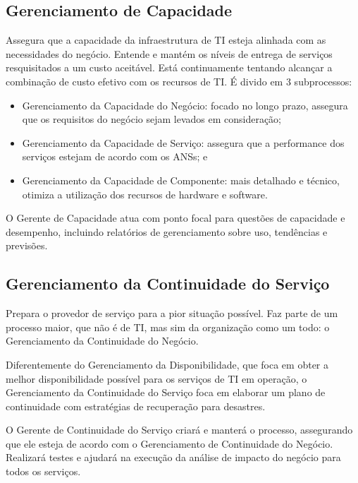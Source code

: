 \subsection{Gerenciamento de Capacidade}
Assegura que a capacidade da infraestrutura de TI esteja alinhada com as
necessidades do negócio. Entende e mantém os níveis de entrega de serviços
resquisitados a um custo aceitável. Está continuamente tentando alcançar a
combinação de custo efetivo com os recursos de TI. É divido em 3 subprocessos:
\begin{itemize}
    \item Gerenciamento da Capacidade do Negócio: focado no longo prazo,
        assegura que os requisitos do negócio sejam levados em consideração;
    \item Gerenciamento da Capacidade de Serviço: assegura que a performance
        dos serviços estejam de acordo com os ANSs; e
    \item Gerenciamento da Capacidade de Componente: mais detalhado e técnico,
        otimiza a utilização dos recursos de hardware e software.
\end{itemize}

O Gerente de Capacidade atua com ponto focal para questões de capacidade e
desempenho, incluindo relatórios de gerenciamento sobre uso, tendências e
previsões.


\subsection{Gerenciamento da Continuidade do Serviço}
Prepara o provedor de serviço para a pior situação possível. Faz parte de um
processo maior, que não é de TI, mas sim da organização como um todo: o
Gerenciamento da Continuidade do Negócio.

Diferentemente do Gerenciamento da Disponibilidade, que foca em obter a melhor
disponibilidade possível para os serviços de TI em operação, o Gerenciamento da
Continuidade do Serviço foca em elaborar um plano de continuidade com
estratégias de recuperação para desastres.

O Gerente de Continuidade do Serviço criará e manterá o processo, assegurando
que ele esteja de acordo com o Gerenciamento de Continuidade do Negócio.
Realizará testes e ajudará na execução da análise de impacto do negócio para
todos os serviços.
